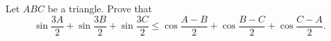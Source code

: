 Let $ABC$ be a triangle. Prove that \[\sin\frac{3A}{2}+\sin\frac{3B}{2}+\sin\frac{3C}{2}\leq\cos\frac{A-B}{2}+\cos\frac{B-C}{2}+\cos\frac{C-A}{2}.\]
